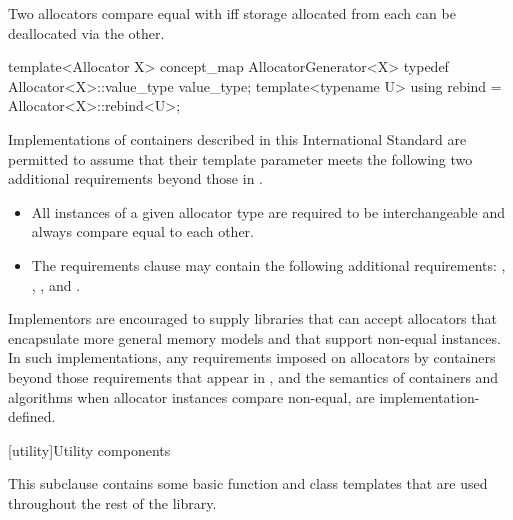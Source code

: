 \documentclass[american,twoside]{book}
\begin{document}
\pnum
Two allocators  compare equal with \tcode{==}
iff storage allocated from each can be deallocated via the other.

\pnum {}
\color{addclr}
\begin{itemdecl}
template<Allocator X>
concept_map AllocatorGenerator<X> {
  typedef Allocator<X>::value_type value_type;
  template<typename U> using rebind = Allocator<X>::rebind<U>;
}
\end{itemdecl}
\color{black}

\pnum
Implementations of containers described in this International Standard
are permitted to assume that their  template parameter meets
the following two additional requirements beyond those in
.

\begin{itemize}
\item
All instances of a given allocator type are required to be interchangeable
and always compare equal to each other.
\item
{} \color{addclr}The
requirements clause may contain the following additional requirements: 
, , , and
.
\end{itemize}

\pnum
Implementors are encouraged to supply libraries that can accept allocators
that encapsulate more general memory models and that support non-equal
instances.
In such implementations, any requirements imposed on allocators
by containers beyond those requirements that appear in
, and the
semantics of containers and algorithms when allocator instances compare
non-equal, are implementation-defined.

[utility]{Utility components}

\pnum
This subclause contains some basic function and class templates that are used
throughout the rest of the library.
\end{document}
